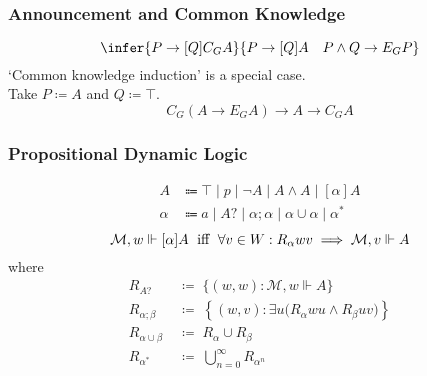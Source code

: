 \documentclass[UTF8,11pt,colorlinks,compress,openany]{beamer}%
\begin{document}
\begin{frame}\frametitle{Announcement and Common Knowledge}
\[\infer{P\to[Q]C_GA}{P\to[Q]A\quad P\wedge Q\to E_GP}\]
`Common knowledge induction' is a special case.\\
Take $P\coloneqq A$ and $Q\coloneqq \top$.
\[C_G(A\to E_GA)\to A\to C_GA\]
\end{frame}

\begin{frame}\frametitle{Propositional Dynamic Logic}
\begin{align*}
 A&\Coloneqq \top\mid p\mid \neg A\mid A\wedge A\mid [\alpha]A\\
\alpha&\Coloneqq a\mid A?\mid \alpha;\alpha\mid\alpha\cup\alpha\mid\alpha^*
\end{align*}
\[\mathcal{M},w\Vdash[\alpha]A \mbox{\; iff \;} \forall v\in W: R_\alpha wv\implies\mathcal{M},v\Vdash A\]
where
\begin{align*}
R_{A?}&\;\coloneqq \;\{(w,w): \mathcal{M},w\Vdash A\}\\
R_{\alpha;\beta}&\;\coloneqq \;\left\{(w,v):\exists u\big(R_{\alpha}wu\wedge R_{\beta}uv\big)\right\}\\
R_{\alpha\cup\beta}&\;\coloneqq \;R_{\alpha}\cup R_{\beta}\\
R_{\alpha^*}&\;\coloneqq \;\bigcup\limits_{n=0}^\infty R_{\alpha^n}
\end{align*}
\end{frame}
\end{document}
